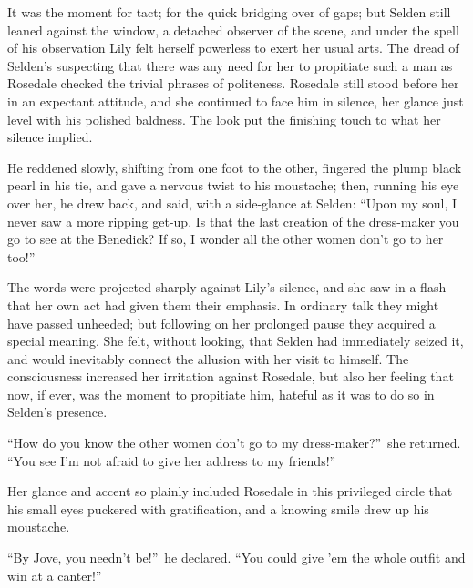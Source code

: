 \documentclass[12pt,a4paper]{book}
\begin{document}
It was the moment for tact; for the quick bridging over of gaps;
but Selden still leaned against the window, a detached observer
of the scene, and under the spell of his observation Lily felt
herself powerless to exert her usual arts. The dread of Selden's
suspecting that there was any need for her to propitiate such a
man as Rosedale checked the trivial phrases of politeness. 
Rosedale still stood before her in an expectant attitude, and she
continued to face him in silence, her glance just level with his
polished baldness. The look put the finishing touch to what her
silence implied.





He reddened slowly, shifting from one foot to the other, fingered
the plump black pearl in his tie, and gave a nervous twist to his
moustache; then, running his eye over her, he drew back, and
said, with a side-glance at Selden: ``Upon my soul, I never saw a
more ripping get-up. Is that the last creation of the dress-maker
you go to see at the Benedick? If so, I wonder all the other
women don't go to her too!''





The words were projected sharply against Lily's silence, and she
saw in a flash that her own act had given them their emphasis. In
ordinary talk they might have passed unheeded; but following on
her prolonged pause they acquired a special meaning. She felt,
without looking, that Selden had immediately seized it, and would
inevitably connect the allusion with her visit to himself. The
consciousness increased her irritation against Rosedale, but also
her feeling that now, if ever, was the moment to
propitiate him, hateful as it was to do so in Selden's presence.





``How do you know the other women don't go to my dress-maker?''\ she
returned. ``You see I'm not afraid to give her address to my
friends!''





Her glance and accent so plainly included Rosedale in this
privileged circle that his small eyes puckered with
gratification, and a knowing smile drew up his moustache.





``By Jove, you needn't be!''\ he declared. ``You could give 'em the
whole outfit and win at a canter!''
\end{document}
